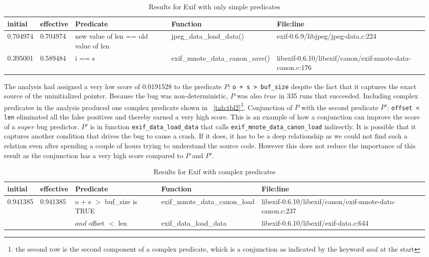 \begin{table*}
\nocaptionrule
\caption{Results for Exif with only simple predicates}
\label{tab:tbl1}
\centering
\scriptsize
\begin{tabular}{lllll}
\toprule
initial & effective & Predicate & Function & File:line \\
\midrule
0.704974 & 0.704974 & new value of len == old value of len & jpeg\_data\_load\_data() & exif-0.6.9/libjpeg/jpeg-data.c:224 \\
0.395001 & 0.589484 & i == s & exif\_mnote\_data\_canon\_save() & libexif-0.6.10/libexif/canon/exif-mnote-data-canon.c:176 \\
\bottomrule
\end{tabular}
\end{table*}

The analysis had assigned a very low score of 0.0191528 to the predicate $P$: \texttt{o + s > buf\_size} despite the fact that it captures the exact source of the uninitialized pointer.  Because the bug was non-deterministic, $P$ was also $true$ in 335 runs that succeeded.  Including complex predicates in the analysis produced one complex predicate shown in ~\autoref{tab:tbl2}{\footnote{the second row is the second component of a complex predicate, which is a conjunction as indicated by the keyword $and$ at the start}}.  Conjunction of $P$ with the second predicate $P'$: \texttt{offset < len} eliminated all the false positives and thereby earned a very high score.  This is an example of how a conjunction can improve the score of a $super$ bug predictor.  $P'$ is in function \texttt{exif\_data\_load\_data} that calls \texttt{exif\_mnote\_data\_canon\_load} indirectly.  It is possible that it captures another condition that drives the bug to cause a crash.  If it does, it has to be a deep relationship as we could not find such a relation even after spending a couple of hours trying to understand the source code.  However this does not reduce the importance of this result as the conjunction has a very high score compared to $P$ and $P'$.

\begin{table*}
\nocaptionrule
\caption{Results for Exif with complex predicates}
\label{tab:tbl2}
\centering
\scriptsize
\begin{tabular}{lllll}
\toprule
initial & effective & Predicate & Function & File:line \\
\midrule
0.941385 & 0.941385 & o + s $>$ buf\_size is TRUE & exif\_mnote\_data\_canon\_load &
 libexif-0.6.10/libexif/canon/exif-mnote-data-canon.c:237 \\
 
         &          & $and$ offset $<$ len & exif\_data\_load\_data & libexif-0.6.10/libexif/exif-data.c:644 \\
\bottomrule
\end{tabular}
\end{table*}

